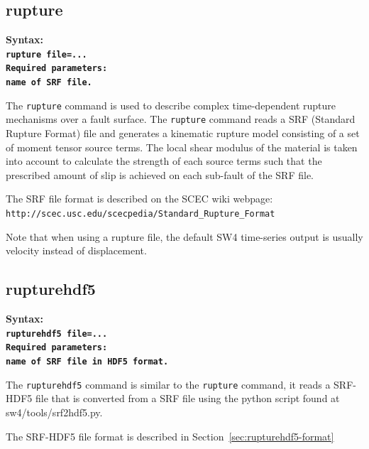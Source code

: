 \documentclass[11pt]{report}
\begin{document}
\subsection{rupture}
\label{keyword:rupture}
\begin{flushleft}
\bf
Syntax:\\ \tt rupture file=...\\ 
\bf
Required parameters:\\ \rm name of SRF file.
\end{flushleft}
The \verb+rupture+ command is used to describe complex time-dependent rupture mechanisms over a
fault surface. The \verb+rupture+ command reads a SRF (Standard Rupture Format) file and generates a
kinematic rupture model consisting of a set of moment tensor source terms. The local shear modulus
of the material is taken into account to calculate the strength of each source terms such that the
prescribed amount of slip is achieved on each sub-fault of the SRF file. 

The SRF file format is described on the SCEC wiki webpage:
\verb+http://scec.usc.edu/scecpedia/Standard_Rupture_Format+

Note that when using a rupture file, the default SW4 time-series output is usually velocity instead of displacement.



\subsection{rupturehdf5}
\label{keyword:rupturehdf5}
\begin{flushleft}
\bf
Syntax:\\ \tt rupturehdf5 file=...\\ 
\bf
Required parameters:\\ \rm name of SRF file in HDF5 format.
\end{flushleft}
The \verb+rupturehdf5+ command is similar to the \verb+rupture+ command, it reads a SRF-HDF5 file that is
converted from a SRF file using the python script found at sw4/tools/srf2hdf5.py.

The SRF-HDF5 file format is described in Section~\ref{sec:rupturehdf5-format}
\end{document}
